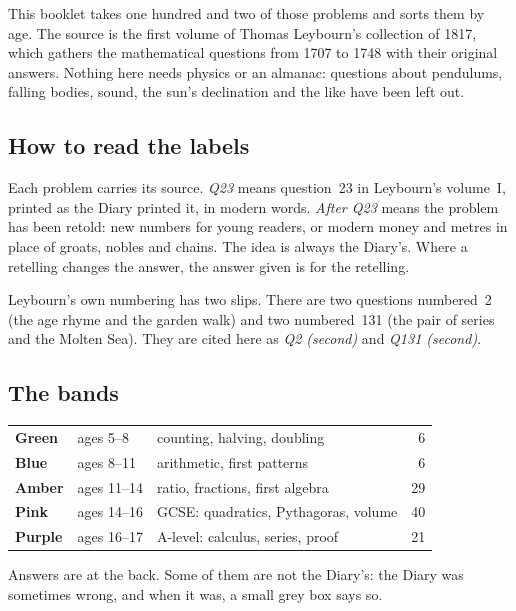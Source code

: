 \documentclass[11pt,a4paper]{article}
\newcounter{prob}
\begin{document}
This booklet takes one hundred and two of those problems and sorts them by age. The
source is the first volume of Thomas Leybourn's collection of 1817, which gathers the
mathematical questions from 1707 to 1748 with their original answers. Nothing here needs
physics or an almanac: questions about pendulums, falling bodies, sound, the sun's
declination and the like have been left out.

\subsection*{How to read the labels}

Each problem carries its source. \textit{Q23} means question~23 in Leybourn's
volume~I, printed as the Diary printed it, in modern words. \textit{After Q23} means
the problem has been retold: new numbers for young readers, or modern money and metres
in place of groats, nobles and chains. The idea is always the Diary's. Where a retelling
changes the answer, the answer given is for the retelling.

Leybourn's own numbering has two slips. There are two questions numbered~2 (the age
rhyme and the garden walk) and two numbered~131 (the pair of series and the Molten Sea).
They are cited here as \textit{Q2 (second)} and \textit{Q131 (second)}.

\subsection*{The bands}

\begin{center}
\begin{tabular}{>{\bfseries}l l l r}
\color{bandgreen}Green  & ages 5--8   & counting, halving, doubling          & 6\\
\color{bandblue}Blue    & ages 8--11  & arithmetic, first patterns          & 6\\
\color{bandamber}Amber  & ages 11--14 & ratio, fractions, first algebra     & 29\\
\color{bandpink}Pink    & ages 14--16 & GCSE: quadratics, Pythagoras, volume & 40\\
\color{bandpurple}Purple & ages 16--17 & A-level: calculus, series, proof    & 21\\
\end{tabular}
\end{center}

Answers are at the back. Some of them are not the Diary's: the Diary was sometimes
wrong, and when it was, a small grey box says so.
\end{document}
